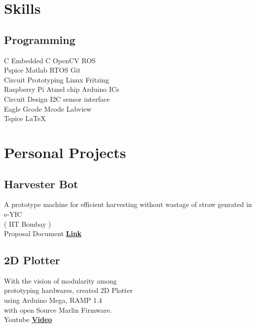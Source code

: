 \documentclass[]{font}
\begin{document}
\begin{minipage}[t]{0.35\textwidth}

\section{Skills}
\subsection{Programming}
C \textbullet{}  Embedded C \textbullet{} OpenCV \textbullet{} ROS   \\
Pspice \textbullet{} Matlab \textbullet{} RTOS   \textbullet{} Git \\
Circuit Prototyping \textbullet{} Linux \textbullet{} Fritzing \\ 
Raspberry Pi \textbullet{} Atmel chip \textbullet{} Arduino \textbullet{} ICs \\
Circuit Design \textbullet{} I2C \textbullet{} sensor interface \\
Eagle \textbullet{} Gcode \textbullet{} Mcode \textbullet{} Labview \\
Tspice \textbullet{} \LaTeX\ \\
\sectionsep



\section{Personal Projects}
\subsection{Harvester Bot}
\textbullet{} A prototype machine for efficient harvesting without wastage of straw genrated in e-YIC \\
( IIT Bombay ) \\
\textbullet{} Proposal Document \textbf{\href{https://drive.google.com/file/d/0B0cF1Lq6c1cPcURJdkJjQmVFcFk3eTgtTGg5VktPVHJWWU5R/view?usp=sharing}{Link}} \\

\vspace{\topsep} %
\subsection{2D Plotter}
\textbullet{} With the vision of modularity among \\
prototyping hardwares, created 2D Plotter \\
using Arduino Mega, RAMP 1.4 \\
with open Source Marlin Firmware. \\
\textbullet{} Youtube \textbf{\href{https://www.youtube.com/watch?v=D679CJQNnKo&t=1s}{Video}} 


\end{minipage}
\end{document}
